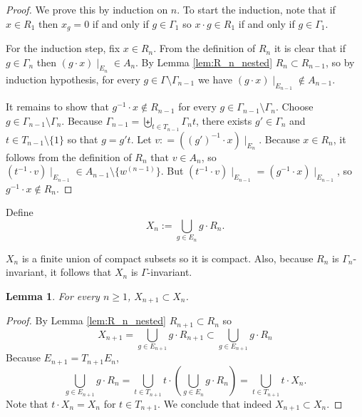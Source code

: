 \documentclass[oneside,english]{amsart}
\newtheorem{lem}[thm]{Lemma}
\theoremstyle{definition}
\begin{document}
\begin{proof}
We prove this by induction on $n$.
To start the induction, note that if $x \in R_1$ then $x_{g}=0$ if and only if $g \in \Gamma_1$ so $x \cdot g \in R_1 $ if and only if $g \in \Gamma_1$.

For the induction step, fix $x \in R_n$. From the definition of $R_n$ it is clear that if $g \in \Gamma_n$ then $(g \cdot x)\mid_{E_n} \in A_n$.  By Lemma \ref{lem:R_n_nested} $R_{n} \subset R_{n-1}$, so by induction hypothesis, for every $g \in \Gamma \setminus  \Gamma_{n-1}$  we have
$ (g \cdot x)\mid_{E_{n-1}} \not\in A_{n-1}$.


It remains to show that $g^{-1} \cdot x  \not \in R_{n-1}$ for every  $g \in \Gamma_{n-1} \setminus \Gamma_n$.
Choose $g \in \Gamma_{n-1} \setminus \Gamma_n$. Because $\Gamma_{n-1} =  \biguplus_{t \in T_{n-1}} \Gamma_{n} t$,  there exists  $g' \in \Gamma_n$ and $t \in T_{n-1} \setminus \{1\}$ so that $g = g't$.
Let $v : = ((g')^{-1} \cdot x)\mid_{E_n}$.
Because $x \in R_n$, it follows from the definition of $R_n$ that $ v \in A_{n}$,
so
$(t^{-1} \cdot v)\mid_{E_{n-1}} \in A_{n-1}  \setminus \{w^{(n-1)}\}$.
But  $(t^{-1} \cdot v)\mid_{E_{n-1}} = (g^{-1} \cdot x )\mid_{E_{n-1}}$, so  $g^{-1} \cdot x \not \in R_{n}$.
\end{proof}

Define
\begin{equation}\label{X_n_def}
X_n := \bigcup_{g \in E_n}g \cdot R_n.
\end{equation}

$X_n$ is a finite union of  compact subsets so it is compact.
Also, because $R_n$ is $\Gamma_n$-invariant, it follows that $X_n$ is $\Gamma$-invariant.

\begin{lem}\label{lem:X_n_nested}
For every $n \ge 1$, $X_{n+1} \subset X_n$.
\end{lem}
\begin{proof}
By Lemma \ref{lem:R_n_nested} $R_{n+1} \subset R_n$ so
$$X_{n+1} = \bigcup_{g \in E_{n+1}}g\cdot R_{n+1}   \subset \bigcup_{g \in E_{n+1}}g\cdot R_{n} $$
Because $E_{n+1}= T_{n+1} E_n $,
$$\bigcup_{g \in E_{n+1}}g \cdot R_{n}  = \bigcup_{t \in T_{n+1}} t \cdot \left(  \bigcup_{g \in E_{n}} g\cdot R_n \right)  =\bigcup_{t \in T_{n+1}} t\cdot  X_n.$$
Note that  $t \cdot X_n  = X_n$ for $t \in T_{n+1}$.
We conclude that indeed $X_{n+1} \subset X_n$.
\end{proof}
\end{document}
